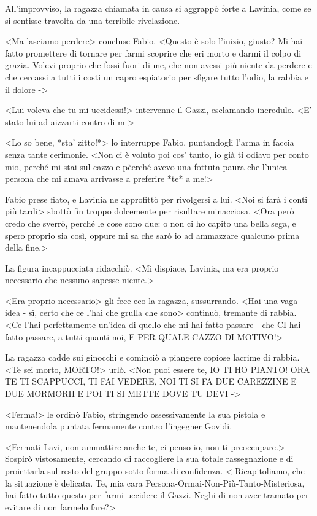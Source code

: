 All'improvviso, la ragazza chiamata in causa si aggrappò forte a Lavinia, come se si sentisse travolta da una terribile rivelazione.

<Ma lasciamo perdere> concluse Fabio. <Questo è solo l'inizio, giusto? Mi hai fatto promettere di tornare per farmi scoprire che eri morto e darmi il colpo di grazia. Volevi proprio che fossi fuori di me, che non avessi più niente da perdere e che cercassi a tutti i costi un capro espiatorio per sfigare tutto l'odio, la rabbia e il dolore ->

<Lui voleva che tu mi uccidessi!> intervenne il Gazzi, esclamando incredulo. <E' stato lui ad aizzarti contro di m->

<Lo so bene, *sta' zitto!*> lo interruppe Fabio, puntandogli l'arma in faccia senza tante cerimonie. <Non ci è voluto poi cos' tanto, io già ti odiavo per conto mio, perché mi stai sul cazzo e pèerché avevo una fottuta paura che l'unica persona che mi amava arrivasse a preferire *te* a me!>

Fabio prese fiato, e Lavinia ne approfittò per rivolgersi a lui. <Noi si farà i conti più tardi> sbottò fin troppo dolcemente per risultare minacciosa. <Ora però credo che sverrò, perché le cose sono due: o non ci ho capito una bella sega, e spero proprio sia così, oppure mi sa che sarò io ad ammazzare qualcuno prima della fine.>

La figura incappucciata ridacchiò. <Mi dispiace, Lavinia, ma era proprio necessario che nessuno sapesse niente.>

<Era proprio necessario> gli fece eco la ragazza, sussurrando. <Hai una vaga idea - sì, certo che ce l'hai che grulla che sono> continuò, tremante di rabbia. <Ce l'hai perfettamente un'idea di quello che mi hai fatto passare - che CI hai fatto passare, a tutti quanti noi, E PER QUALE CAZZO DI MOTIVO!> 

La ragazza cadde sui ginocchi e cominciò a piangere copiose lacrime di rabbia. <Te sei morto, MORTO!> urlò. <Non puoi essere te, IO TI HO PIANTO! ORA TE TI SCAPPUCCI, TI FAI VEDERE, NOI TI SI FA DUE CAREZZINE E DUE MORMORII E POI TI SI METTE DOVE TU DEVI ->

<Ferma!> le ordinò Fabio, stringendo ossessivamente la sua pistola e mantenendola puntata fermamente contro l'ingegner Govidi. 

<Fermati Lavi, non ammattire anche te, ci penso io, non ti preoccupare.> Sospirò vistosamente, cercando di raccogliere la sua totale rassegnazione e di proiettarla sul resto del gruppo sotto forma di confidenza. < Ricapitoliamo, che la situazione è delicata. Te, mia cara Persona-Ormai-Non-Più-Tanto-Misteriosa, hai fatto tutto questo per farmi uccidere il Gazzi. Neghi di non aver tramato per evitare di non farmelo fare?>

